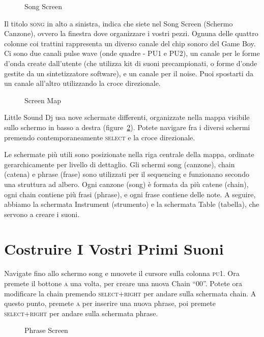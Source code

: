 \begin{figure}[hbtp]
\centering
{}
\caption{Song Screen}
\label{fig:song}
\end{figure}

Il titolo \textsc{song} in alto a sinistra, indica che siete nel Song Screen (Schermo Canzone), ovvero la finestra dove organizzare i vostri pezzi. Ognuna delle quattro colonne coi trattini rappresenta un diverso canale del chip sonoro del Game Boy. Ci sono due canali pulse wave (onde quadre - PU1 e PU2), un canale per le forme d’onda create dall’utente (che utilizza kit di suoni precampionati, o forme d’onde gestite da un sintetizzatore software), e un canale per il noise.
Puoi spostarti da un canale all’altro utilizzando la croce direzionale.


\begin{figure}[hbtp]
\centering
{}
\caption{Screen Map}
\label{fig:map}
\end{figure}

Little Sound Dj usa nove schermate differenti, organizzate nella mappa visibile sullo schermo in basso a destra (figure~\ref{fig:map}).  Potete navigare fra i diversi schermi premendo contemporaneamente \textsc{select} e la croce direzionale. 

Le schermate più utili sono posizionate nella riga centrale della mappa, ordinate gerarchicamente per livello di dettaglio.
Gli schermi song (canzone), chain (catena) e phrase (frase) sono utilizzati per il sequencing e funzionano secondo una struttura ad albero. Ogni canzone (song) è formata da più catene (chain), ogni chain contiene più frasi (phrase), e ogni frase contiene delle note. A seguire, abbiamo la schermata Instrument (strumento) e la schermata Table (tabella), che servono a creare i suoni.

\section{Costruire I Vostri Primi Suoni}


Navigate fino allo schermo song e muovete il cursore sulla colonna \textsc{pu1}. Ora premete il bottone \textsc{a} una volta, per creare una nuova Chain “00”.
Potete ora modificare la chain premendo \textsc{select+right} per andare sulla schermata chain.
A questo punto, premete \textsc{a} per inserire una nuova phrase, poi premete \textsc{select+right} per andare sulla schermata phrase.

\begin{figure}[hbtp]
\centering
{}
\caption{Phrase Screen}
\label{fig:phrase1}
\end{figure}

